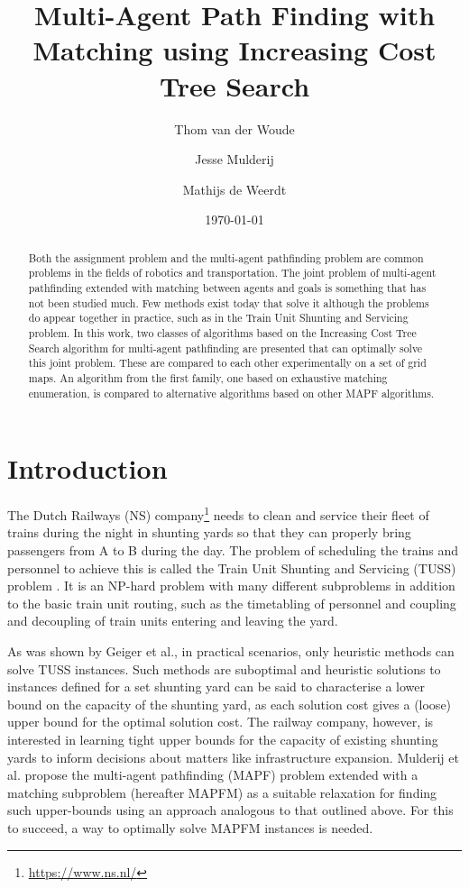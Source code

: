 \documentclass[english,10pt]{article}
\begin{document}
	
	\title{Multi-Agent Path Finding with Matching using Increasing Cost Tree Search}
	
	\author{Thom van der Woude\and Jesse Mulderij\and Mathijs de Weerdt}
	\date{\today}
	
	\maketitle
	
	\begin{abstract}
		Both the assignment problem and the multi-agent pathfinding problem are common problems in the fields of robotics and transportation. The joint problem of multi-agent pathfinding extended with matching between agents and goals is something that has not been studied much. Few methods exist today that solve it although the problems do appear together in practice, such as in the Train Unit Shunting and Servicing problem. In this work, two classes of algorithms based on the Increasing Cost Tree Search algorithm for multi-agent pathfinding are presented that can optimally solve this joint problem. These are compared to each other experimentally on a set of grid maps. An algorithm from the first family, one based on exhaustive matching enumeration, is compared to alternative algorithms based on other MAPF algorithms.
	\end{abstract}
	
	\section{Introduction}
	The Dutch Railways (NS) company\footnote{\url{https://www.ns.nl/}} needs to clean and service their fleet of trains during the night in shunting yards so that they can properly bring passengers from A to B during the day. 
	The problem of scheduling the trains and personnel to achieve this is called the Train Unit Shunting and Servicing (TUSS) problem \cite{mulderij2020}. 
	It is an NP-hard problem with many different subproblems in addition to the basic train unit routing, such as the timetabling of personnel and coupling and decoupling of train units entering and leaving the yard. %
	
	As was shown by Geiger et al.\cite{geiger2018}, in practical scenarios, only heuristic methods can solve TUSS instances. 
	Such methods are suboptimal and heuristic solutions to instances defined for a set shunting yard can be said to characterise a lower bound on the capacity of the shunting yard, as each solution cost gives a (loose) upper bound for the optimal solution cost. 
	The railway company, however, is interested in learning tight upper bounds for the capacity of existing shunting yards to inform decisions about matters like infrastructure expansion. 
	Mulderij et al. \cite{mulderij2020} propose the multi-agent pathfinding (MAPF) problem \cite{stern2019} extended with a matching subproblem (hereafter MAPFM) as a suitable relaxation for finding such upper-bounds using an approach analogous to that outlined above.
	For this to succeed, a way to optimally solve MAPFM instances is needed.
	
\end{document}
